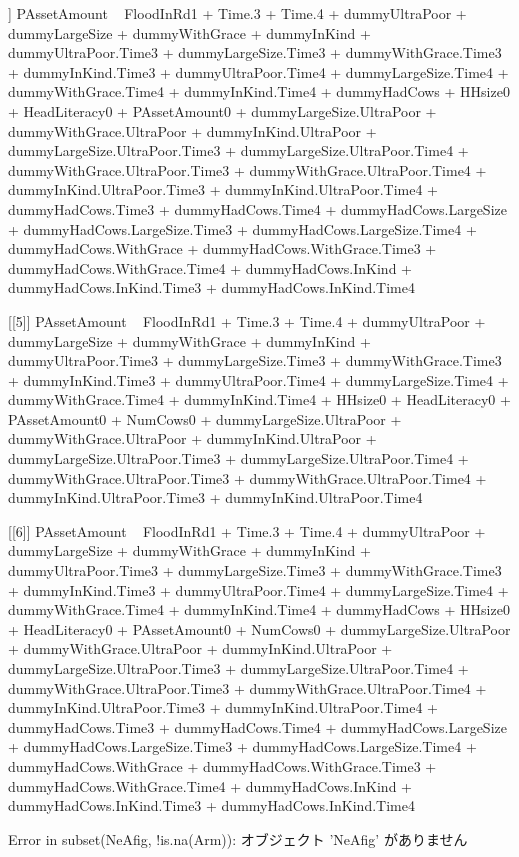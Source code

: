 \begin{Schunk}
\begin{Soutput}
[[4]]
PAssetAmount ~ FloodInRd1 + Time.3 + Time.4 + dummyUltraPoor + 
    dummyLargeSize + dummyWithGrace + dummyInKind + dummyUltraPoor.Time3 + 
    dummyLargeSize.Time3 + dummyWithGrace.Time3 + dummyInKind.Time3 + 
    dummyUltraPoor.Time4 + dummyLargeSize.Time4 + dummyWithGrace.Time4 + 
    dummyInKind.Time4 + dummyHadCows + HHsize0 + HeadLiteracy0 + 
    PAssetAmount0 + dummyLargeSize.UltraPoor + dummyWithGrace.UltraPoor + 
    dummyInKind.UltraPoor + dummyLargeSize.UltraPoor.Time3 + 
    dummyLargeSize.UltraPoor.Time4 + dummyWithGrace.UltraPoor.Time3 + 
    dummyWithGrace.UltraPoor.Time4 + dummyInKind.UltraPoor.Time3 + 
    dummyInKind.UltraPoor.Time4 + dummyHadCows.Time3 + dummyHadCows.Time4 + 
    dummyHadCows.LargeSize + dummyHadCows.LargeSize.Time3 + dummyHadCows.LargeSize.Time4 + 
    dummyHadCows.WithGrace + dummyHadCows.WithGrace.Time3 + dummyHadCows.WithGrace.Time4 + 
    dummyHadCows.InKind + dummyHadCows.InKind.Time3 + dummyHadCows.InKind.Time4

[[5]]
PAssetAmount ~ FloodInRd1 + Time.3 + Time.4 + dummyUltraPoor + 
    dummyLargeSize + dummyWithGrace + dummyInKind + dummyUltraPoor.Time3 + 
    dummyLargeSize.Time3 + dummyWithGrace.Time3 + dummyInKind.Time3 + 
    dummyUltraPoor.Time4 + dummyLargeSize.Time4 + dummyWithGrace.Time4 + 
    dummyInKind.Time4 + HHsize0 + HeadLiteracy0 + PAssetAmount0 + 
    NumCows0 + dummyLargeSize.UltraPoor + dummyWithGrace.UltraPoor + 
    dummyInKind.UltraPoor + dummyLargeSize.UltraPoor.Time3 + 
    dummyLargeSize.UltraPoor.Time4 + dummyWithGrace.UltraPoor.Time3 + 
    dummyWithGrace.UltraPoor.Time4 + dummyInKind.UltraPoor.Time3 + 
    dummyInKind.UltraPoor.Time4

[[6]]
PAssetAmount ~ FloodInRd1 + Time.3 + Time.4 + dummyUltraPoor + 
    dummyLargeSize + dummyWithGrace + dummyInKind + dummyUltraPoor.Time3 + 
    dummyLargeSize.Time3 + dummyWithGrace.Time3 + dummyInKind.Time3 + 
    dummyUltraPoor.Time4 + dummyLargeSize.Time4 + dummyWithGrace.Time4 + 
    dummyInKind.Time4 + dummyHadCows + HHsize0 + HeadLiteracy0 + 
    PAssetAmount0 + NumCows0 + dummyLargeSize.UltraPoor + dummyWithGrace.UltraPoor + 
    dummyInKind.UltraPoor + dummyLargeSize.UltraPoor.Time3 + 
    dummyLargeSize.UltraPoor.Time4 + dummyWithGrace.UltraPoor.Time3 + 
    dummyWithGrace.UltraPoor.Time4 + dummyInKind.UltraPoor.Time3 + 
    dummyInKind.UltraPoor.Time4 + dummyHadCows.Time3 + dummyHadCows.Time4 + 
    dummyHadCows.LargeSize + dummyHadCows.LargeSize.Time3 + dummyHadCows.LargeSize.Time4 + 
    dummyHadCows.WithGrace + dummyHadCows.WithGrace.Time3 + dummyHadCows.WithGrace.Time4 + 
    dummyHadCows.InKind + dummyHadCows.InKind.Time3 + dummyHadCows.InKind.Time4
\end{Soutput}
\end{Schunk}
\begin{Schunk}
\begin{Soutput}
Error in subset(NeAfig, !is.na(Arm)):  オブジェクト 'NeAfig' がありません 
\end{Soutput}
\end{Schunk}


